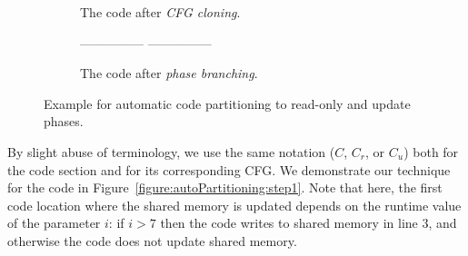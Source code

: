 \begin{figure*}
\begin{center}
\begin{subfigure}[b]{.3\textwidth}
\begin{algorithmic}[0]{}
{			\EndFunction
			}
		\end{algorithmic}
		\caption{The code after \emph{CFG cloning}.}
 \label{figure:autoPartitioning:step2}
	\end{subfigure}
	\begin{subfigure}[b]{.35\textwidth}
		\begin{algorithmic}[0]{}
		{\ttfamily
			 \label{codeXXX:aaaaa}
            \Statex --------------- 
            \State\hspace{-3mm}{1 :\ x.lock()}
            \State\hspace{-3mm}{2 :\ if i>7  then}
            \State{}
            \State\hspace{-3mm}{4 :\ temp = x.f1 + x.f2}
            \State\hspace{-3mm}{5 :\ x.unlock()}
            \State{}
            \Statex --------------- 
            \State\hspace{-3mm}{1':\ x.lock()}
            \State\hspace{-3mm}{2':\ if x.f1>i  then}
            \State\hspace{-3mm}{3':\ \ \ x.f2 = i}
            \State\hspace{-3mm}{4':\ temp = x.f1 + x.f2}
            \State\hspace{-3mm}{5':\ x.unlock()}
            \State\hspace{-3mm}{6':\ return temp}
			\EndFunction
			}
		\end{algorithmic}
		\caption{The code after \emph{phase branching}.
} \label{figure:autoPartitioning:step3}
	\end{subfigure}

	\end{center}
\vspace{-4mm}
	\caption{Example for automatic code partitioning to read-only and update phases.}
			\label{figure:autoPartitioning}
\end{figure*}

By slight abuse of terminology, we use the same notation ($C$, $C_r$, or $C_u$) both for the code section and
for its corresponding CFG.
%
We demonstrate our technique for the code in Figure~\ref{figure:autoPartitioning:step1}.
Note that here, the first code location where the shared memory is updated depends on the runtime value of the parameter $i$: if $i>7$ then the code writes to shared memory in line $3$, and otherwise the code does not update shared memory.

